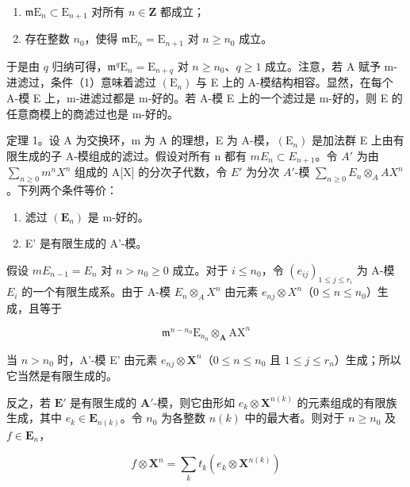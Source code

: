 \begin{enumerate}
\def\labelenumi{(\arabic{enumi})}
\item
  \(\mathfrak{m}\mathrm{E}_n\subset \mathrm{E}_{n + 1}\) 对所有 \(n\in \mathbf{Z}\) 都成立；
\item
  存在整数 \(n_0\)，使得 \(\mathfrak{m}\mathrm{E}_n = \mathrm{E}_{n+1}\) 对 \(n \geqslant n_0\) 成立。
\end{enumerate}

于是由 \(q\) 归纳可得，\(\mathfrak{m}^q\mathrm{E}_n = \mathrm{E}_{n + q}\) 对 \(n \geqslant n_0\)、\(q \geqslant 1\) 成立。注意，若 A 赋予 m-进滤过，条件（1）意味着滤过 \((\mathrm{E}_n)\) 与 E 上的 A-模结构相容。显然，在每个 A-模 E 上，m-进滤过都是 m-好的。若 A-模 E 上的一个滤过是 m-好的，则 E 的任意商模上的商滤过也是 m-好的。

定理 1。设 A 为交换环，m 为 A 的理想，E 为 A-模，\((\mathrm{E}_{n})\) 是加法群 E 上由有限生成的子 A-模组成的滤过。假设对所有 n 都有 \(mE_{n} \subset E_{n+1}\)。令 \(A'\) 为由 \(\sum_{n \geqslant 0} m^{n} X^{n}\) 组成的 A{[}X{]} 的分次子代数，令 \(E'\) 为分次 \(A'\)-模 \(\sum_{n \geqslant 0} E_{n} \otimes_{A} AX^{n}\)。下列两个条件等价：

\begin{enumerate}
\def\labelenumi{(\alph{enumi})}
\item
  滤过 \((\mathbf{E}_n)\) 是 m-好的。
\item
  E' 是有限生成的 A'-模。
\end{enumerate}

假设 \(mE_{n-1} = E_n\) 对 \(n > n_0 \geqslant 0\) 成立。对于 \(i \leqslant n_0\)，令 \((e_{ij})_{1 \leqslant j \leqslant r_i}\) 为 A-模 \(E_i\) 的一个有限生成系。由于 A-模 \(E_n \otimes_A X^n\) 由元素 \(e_{nj} \otimes X^n\)（\(0 \leqslant n \leqslant n_0\)）生成，且等于

\[
\mathfrak {m} ^ {n - n _ {0}} \mathrm{E} _ {n _ {0}} \otimes_ {\mathbf {A}} \mathrm{AX} ^ {n}
\]

当 \(n > n_0\) 时，A'-模 E' 由元素 \(e_{nj} \otimes \mathbf{X}^n\)（\(0 \leqslant n \leqslant n_0\) 且 \(1 \leqslant j \leqslant r_n\)）生成；所以它当然是有限生成的。

反之，若 \(\mathbf{E}'\) 是有限生成的 \(\mathbf{A}'\)-模，则它由形如 \(e_k \otimes \mathbf{X}^{n(k)}\) 的元素组成的有限族生成，其中 \(e_k \in \mathbf{E}_{n(k)}\)。令 \(n_0\) 为各整数 \(n(k)\) 中的最大者。则对于 \(n \geqslant n_0\) 及 \(f \in \mathbf{E}_n\)，

\[
f \otimes \mathbf {X} ^ {n} = \sum_ {k} t _ {k} (e _ {k} \otimes \mathbf {X} ^ {n (k)})
\]

